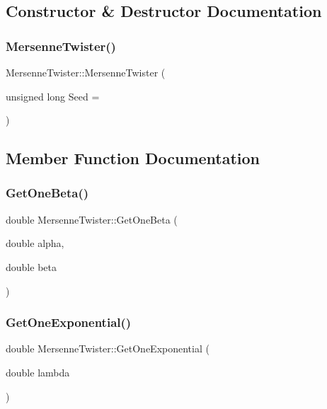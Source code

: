 \subsection{Constructor \& Destructor Documentation}
\hypertarget{classMersenneTwister_acf1f07fd0042402eab012c3c73e2056a}{}\label{classMersenneTwister_acf1f07fd0042402eab012c3c73e2056a} 
\subsubsection{\texorpdfstring{Mersenne\+Twister()}{MersenneTwister()}}
{\footnotesize\ttfamily Mersenne\+Twister\+::\+Mersenne\+Twister (\begin{DoxyParamCaption}\item[{unsigned long}]{Seed = {} }\end{DoxyParamCaption})\hspace{0.3cm}{\ttfamily [explicit]}}



\subsection{Member Function Documentation}
\hypertarget{classMersenneTwister_aedadeab9156bff904f5538e568aec96c}{}\label{classMersenneTwister_aedadeab9156bff904f5538e568aec96c} 
\subsubsection{\texorpdfstring{Get\+One\+Beta()}{GetOneBeta()}}
{\footnotesize\ttfamily double Mersenne\+Twister\+::\+Get\+One\+Beta (\begin{DoxyParamCaption}\item[{double}]{alpha,  }\item[{double}]{beta }\end{DoxyParamCaption})}

\hypertarget{classMersenneTwister_a782c5eae24a07b8af2ee7a61bb813e0b}{}\label{classMersenneTwister_a782c5eae24a07b8af2ee7a61bb813e0b} 
\subsubsection{\texorpdfstring{Get\+One\+Exponential()}{GetOneExponential()}}
{\footnotesize\ttfamily double Mersenne\+Twister\+::\+Get\+One\+Exponential (\begin{DoxyParamCaption}\item[{double}]{lambda }\end{DoxyParamCaption})}

